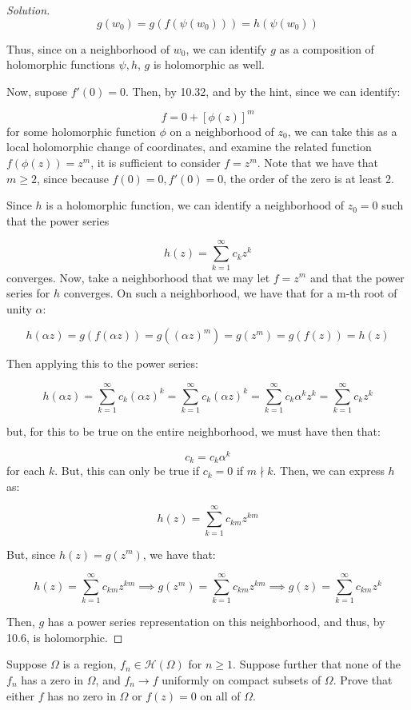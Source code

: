 \documentclass[10pt]{article}
\newenvironment{problem}[2][]{\begin{trivlist}
\item[\hskip \labelsep {\bfseries #1}\hskip \labelsep {\bfseries #2.}]}{\end{trivlist}}
\begin{document}
\begin{proof}[Solution]
$$ g(w_0) = g(f(\psi(w_0))) = h(\psi(w_0)) $$

Thus, since on a neighborhood of $w_0$, we can identify $g$ as a composition of holomorphic functions $\psi, h$, $g$ is holomorphic as well.

Now, supose $f'(0) = 0$. Then, by 10.32, and by the hint, since we can identify:

$$ f = 0 + [\phi(z)]^m $$ for some holomorphic function $\phi$ on a neighborhood of $z_0$, we can take this as a local holomorphic change of coordinates, and examine the related function $f(\phi(z)) = z^m$, it is sufficient to consider $f = z^m$. Note that we have that $m \geq 2$, since because $f(0) = 0, f'(0) = 0$, the order of the zero is at least 2.

Since $h$ is a holomorphic function, we can identify a neighborhood of $z_0 = 0$ such that the power series

$$ h(z) = \sum_{k=1}^\infty c_k z^k $$ converges. Now, take a neighborhood that we may let $f = z^m$ and that the power series for $h$ converges. On such a neighborhood, we have that for a m-th root of unity $\alpha$:

$$ h(\alpha z) = g(f(\alpha z)) = g((\alpha z)^m) = g(z^m) = g(f(z)) = h(z) $$

Then applying this to the power series:

 $$ h(\alpha z) = \sum_{k=1}^\infty c_k (\alpha z)^k =  \sum_{k=1}^\infty c_k (\alpha z)^k = \sum_{k=1}^\infty c_k \alpha^k z^k =  \sum_{k=1}^\infty c_k z^k$$

but, for this to be true on the entire neighborhood, we must have then that:

$$ c_k = c_k \alpha^k$$ for each $k$. But, this can only be true if $c_k = 0$ if $m \nmid k$. Then, we can express $h$ as:

$$h(z) = \sum_{k=1}^\infty c_{km} z^{km}$$

But, since $h(z) = g(z^m)$, we have that:

$$ h(z) = \sum_{k=1}^\infty c_{km} z^{km} \implies g(z^m) = \sum_{k=1}^\infty c_{km} z^{km} \implies g(z) = \sum_{k=1}^\infty c_{km} z^{k}$$

Then, $g$ has a power series representation on this neighborhood, and thus, by 10.6, is holomorphic.


\end{proof}


\begin{problem}{Question 5}

Suppose $\Omega$ is a region, $f_n \in \mathcal{H}(\Omega)$ for $n \geq 1$. Suppose further that none of the $f_n$ has a zero in $\Omega$, and $f_n \to f$ uniformly on compact subsets of $\Omega$. Prove that either $f$ has no zero in $\Omega$ or $f(z) = 0$ on all of $\Omega$.

\end{problem}
\end{document}
